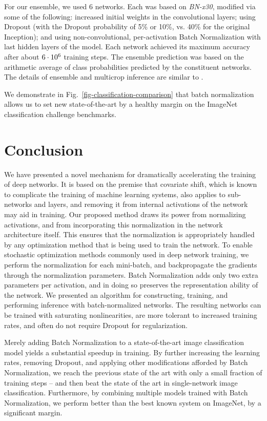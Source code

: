 \documentclass[twocolumn]{article}
\begin{document}
For our ensemble, we used 6 networks. Each was based on {\sl BN-x30},
modified via some of the following: increased initial weights in the
convolutional layers; using Dropout (with the Dropout probability of
5\% or 10\%, vs. 40\% for the original Inception); and using
non-convolutional, per-activation Batch Normalization with last hidden
layers of the model. Each network achieved its maximum accuracy after
about $6\cdot 10^6$ training steps.  The ensemble prediction was based on
the arithmetic average of class probabilities predicted by the
constituent networks. The details of ensemble and multicrop inference
are similar to \cite{inception}.

We demonstrate in Fig.~\ref{fig-classification-comparison} that batch
normalization allows us to set new state-of-the-art by a healthy
margin on the ImageNet classification challenge benchmarks.

\section{Conclusion}

We have presented a novel mechanism for dramatically accelerating the
training of deep networks. It is based on the premise that covariate
shift, which is known to complicate the training of machine learning
systems, also applies to sub-networks and layers, and removing it from
internal activations of the network may aid in training. Our proposed
method draws its power from normalizing activations, and from
incorporating this normalization in the network architecture
itself. This ensures that the normalization is appropriately handled
by any optimization method that is being used to train the network. To
enable stochastic optimization methods commonly used in deep network
training, we perform the normalization for each mini-batch, and
backpropagate the gradients through the normalization
parameters. Batch Normalization adds only two extra parameters per
activation, and in doing so preserves the representation ability of
the network. We presented an algorithm for constructing, training, and
performing inference with batch-normalized networks. The resulting
networks can be trained with saturating nonlinearities, are more
tolerant to increased training rates, and often do not require Dropout
for regularization.

Merely adding Batch Normalization to a state-of-the-art image
classification model yields a substantial speedup in training. By
further increasing the learning rates, removing Dropout, and applying
other modifications afforded by Batch Normalization, we reach the
previous state of the art with only a small fraction of training steps
-- and then beat the state of the art in single-network image
classification. Furthermore, by combining multiple models trained with
Batch Normalization, we perform better than the best known system on
ImageNet, by a significant margin.
\end{document}
